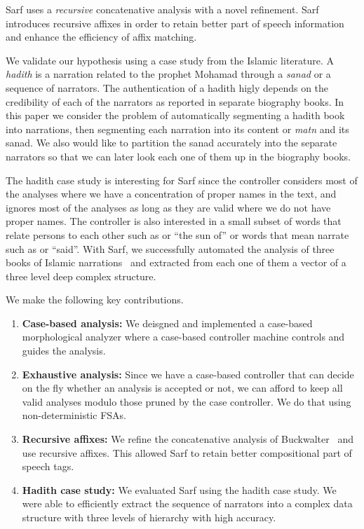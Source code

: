 \documentclass[11pt,letterpaper]{article}
\begin{document}
Sarf uses a {\em recursive} concatenative analysis with a novel 
refinement. 
Sarf introduces recursive affixes in order to
retain better part of speech information and enhance the 
efficiency of affix matching. 

We validate our hypothesis using a case study from the Islamic 
literature. 
A {\em hadith} is a narration related to the prophet Mohamad
through a {\em sanad} or a sequence of narrators. 
The authentication of a hadith higly depends on the credibility
of each of the narrators as reported in separate biography 
books. 
In this paper we consider the problem of automatically segmenting
a hadith book into narrations, then segmenting each narration into
its content or {\em matn} and its sanad.
We also would like to partition the sanad accurately into the 
separate narrators so that we can later look each one of them 
up in the biography books. 

The hadith case study is interesting for Sarf since the controller
considers most of the analyses where we have a concentration
of proper names in the text, and ignores most of the analyses as long 
as they are valid where we do not have proper names. 
The controller is also interested in a small subset of words 
that relate persons to each other such as  or ``the sun of''
or words that mean narrate such as  or ``said''. 
With Sarf, we successfully automated the analysis of 
three books of Islamic narrations~\cite{narrations1,narrations2, narrations3}
and extracted from each one of them a vector of a three level deep
complex structure. 


We make the following key contributions. 
\begin{enumerate}
\item {\bf Case-based analysis:}  We deisgned and implemented
a case-based morphological analyzer where a case-based controller
machine controls and guides the analysis. 
\item {\bf Exhaustive analysis:} Since we have a case-based 
controller that can decide on the fly whether an analysis is 
accepted or not, we can afford to keep all valid analyses modulo
those pruned by the case controller. 
We do that using non-deterministic FSAs. 
\item {\bf Recursive affixes:}
We refine the concatenative analysis of 
Buckwalter~  and use recursive affixes. 
This allowed Sarf to retain better compositional part of speech
tags.
\item {\bf Hadith case study:}
We evaluated Sarf using the hadith case study. We were able to
efficiently extract the sequence of narrators into a complex
data structure with three levels of hierarchy with high accuracy. 
\end{enumerate}
\end{document}
